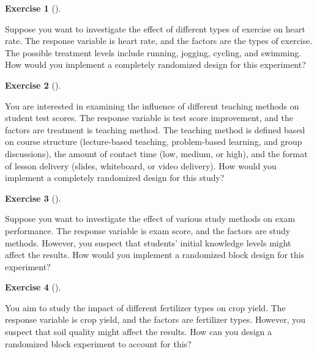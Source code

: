 \documentclass[
  letterpaper,
  DIV=11,
  numbers=noendperiod]{scrreprt}
\theoremstyle{definition}
\newtheorem{exercise}{Exercise}[chapter]
\theoremstyle{definition}
\theoremstyle{definition}
\theoremstyle{remark}
\begin{document}
\begin{exercise}[]\protect\hypertarget{exr-10.20}{}\label{exr-10.20}

Suppose you want to investigate the effect of different types of
exercise on heart rate. The response variable is heart rate, and the
factors are the types of exercise. The possible treatment levels include
running, jogging, cycling, and swimming. How would you implement a
completely randomized design for this experiment?

\end{exercise}

\begin{exercise}[]\protect\hypertarget{exr-10.21}{}\label{exr-10.21}

You are interested in examining the influence of different teaching
methods on student test scores. The response variable is test score
improvement, and the factors are treatment is teaching method. The
teaching method is defined based on course structure (lecture-based
teaching, problem-based learning, and group discussions), the amount of
contact time (low, medium, or high), and the format of lesson delivery
(slides, whiteboard, or video delivery). How would you implement a
completely randomized design for this study?

\end{exercise}

\begin{exercise}[]\protect\hypertarget{exr-10.22}{}\label{exr-10.22}

Suppose you want to investigate the effect of various study methods on
exam performance. The response variable is exam score, and the factors
are study methods. However, you suspect that students' initial knowledge
levels might affect the results. How would you implement a randomized
block design for this experiment?

\end{exercise}

\begin{exercise}[]\protect\hypertarget{exr-10.23}{}\label{exr-10.23}

You aim to study the impact of different fertilizer types on crop yield.
The response variable is crop yield, and the factors are fertilizer
types. However, you suspect that soil quality might affect the results.
How can you design a randomized block experiment to account for this?

\end{exercise}
\end{document}
